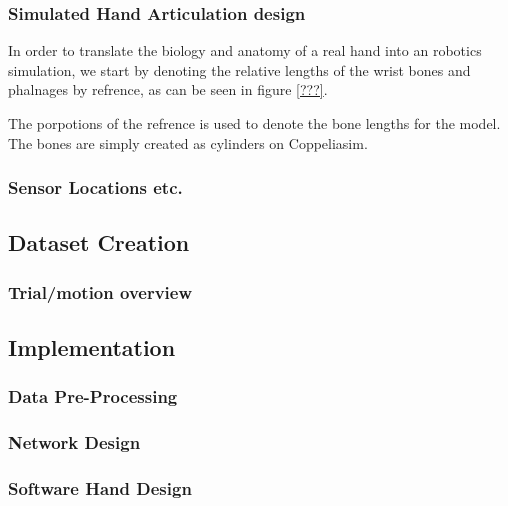 \documentclass[../main.tex]{subfiles}
\begin{document}

\subsubsection{Simulated Hand Articulation design}

In order to translate the biology and anatomy of a real hand into an robotics simulation, we start by denoting the relative lengths of the wrist bones and phalnages by refrence, as can be seen in figure \ref{???}.


The porpotions of the refrence is used to denote the bone lengths for the model. The bones are simply created as cylinders on Coppeliasim.

\subsubsection{Sensor Locations etc.}

\subsection{Dataset Creation}


\subsubsection{Trial/motion overview}

\subsection{Implementation}
\subsubsection{Data Pre-Processing}
\subsubsection{Network Design}
\subsubsection{Software Hand Design}
\end{document}
